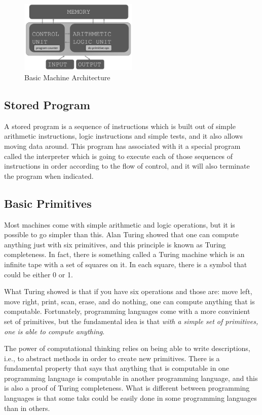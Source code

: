 \documentclass[a4paper]{article}
\begin{document}
\begin{figure}[h!]
  \centering
  \includegraphics[width=0.5\textwidth]{machine_architecture.png}
  \caption{Basic Machine Architecture}
\end{figure}

\subsection{Stored Program}

A stored program is a sequence of instructions which is built out of simple
arithmetic instructions, logic instructions and simple tests, and it also
allows moving data around. This program has associated with it a special
program called the interpreter which is going to execute each of those
sequences of instructions in order according to the flow of control, and it
will also terminate the program when indicated.

\subsection{Basic Primitives}

Most machines come with simple arithmetic and logic operations, but it is
possible to go simpler than this. Alan Turing showed that one can compute
anything just with six primitives, and this principle is known as Turing
completeness. In fact, there is something called a Turing machine which is an
infinite tape with a set of squares on it. In each square, there is a symbol
that could be either 0 or 1.

What Turing showed is that if you have six operations and those are: move left,
move right, print, scan, erase, and do nothing, one can compute anything
that is computable. Fortunately, programming languages come with a more
convinient set of primitives, but the fundamental idea is that
\textit{with a simple set of primitives, one is able to compute anything}.

The power of computational thinking relies on being able to write descriptions,
i.e., to abstract methods in order to create new primitives. There is a
fundamental property that says that anything that is computable in one
programming language is computable in another programming language, and this is
also a proof of Turing completeness. What is different between programming
languages is that some taks could be easily done in some programming languages
than in others.
\end{document}
